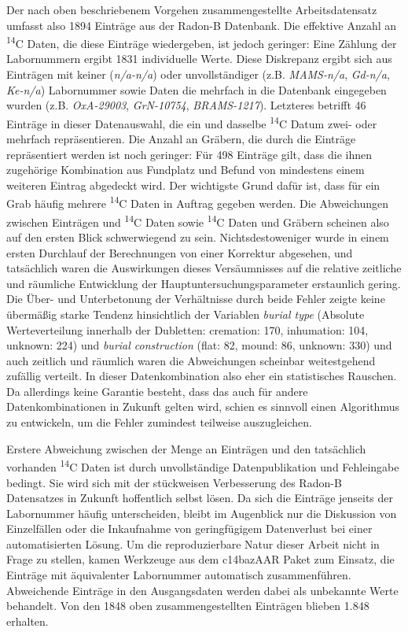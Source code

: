 \documentclass[openany,twoside,twocolumn]{book}
\begin{document}
Der nach oben beschriebenem Vorgehen zusammengestellte Arbeitsdatensatz
umfasst also 1894 Einträge aus der Radon-B Datenbank. Die effektive
Anzahl an \textsuperscript{14}C Daten, die diese Einträge wiedergeben,
ist jedoch geringer: Eine Zählung der Labornummern ergibt 1831
individuelle Werte. Diese Diskrepanz ergibt sich aus Einträgen mit
keiner (\emph{n/a-n/a}) oder unvollständiger (z.B. \emph{MAMS-n/a},
\emph{Gd-n/a}, \emph{Ke-n/a}) Labornummer sowie Daten die mehrfach in
die Datenbank eingegeben wurden (z.B. \emph{OxA-29003},
\emph{GrN-10754}, \emph{BRAMS-1217}). Letzteres betrifft 46 Einträge in
dieser Datenauswahl, die ein und dasselbe \textsuperscript{14}C Datum
zwei- oder mehrfach repräsentieren. Die Anzahl an Gräbern, die durch die
Einträge repräsentiert werden ist noch geringer: Für 498 Einträge gilt,
dass die ihnen zugehörige Kombination aus Fundplatz und Befund von
mindestens einem weiteren Eintrag abgedeckt wird. Der wichtigste Grund
dafür ist, dass für ein Grab häufig mehrere \textsuperscript{14}C Daten
in Auftrag gegeben werden. Die Abweichungen zwischen Einträgen und
\textsuperscript{14}C Daten sowie \textsuperscript{14}C Daten und
Gräbern scheinen also auf den ersten Blick schwerwiegend zu sein.
Nichtsdestoweniger wurde in einem ersten Durchlauf der Berechnungen von
einer Korrektur abgesehen, und tatsächlich waren die Auswirkungen dieses
Versäumnisses auf die relative zeitliche und räumliche Entwicklung der
Hauptuntersuchungsparameter erstaunlich gering. Die Über- und
Unterbetonung der Verhältnisse durch beide Fehler zeigte keine übermäßig
starke Tendenz hinsichtlich der Variablen \emph{burial type} (Absolute
Werteverteilung innerhalb der Dubletten: cremation: 170, inhumation:
104, unknown: 224) und \emph{burial construction} (flat: 82, mound: 86,
unknown: 330) und auch zeitlich und räumlich waren die Abweichungen
scheinbar weitestgehend zufällig verteilt. In dieser Datenkombination
also eher ein statistisches Rauschen. Da allerdings keine Garantie
besteht, dass das auch für andere Datenkombinationen in Zukunft gelten
wird, schien es sinnvoll einen Algorithmus zu entwickeln, um die Fehler
zumindest teilweise auszugleichen.

Erstere Abweichung zwischen der Menge an Einträgen und den tatsächlich
vorhanden \textsuperscript{14}C Daten ist durch unvollständige
Datenpublikation und Fehleingabe bedingt. Sie wird sich mit der
stückweisen Verbesserung des Radon-B Datensatzes in Zukunft hoffentlich
selbst lösen. Da sich die Einträge jenseits der Labornummer häufig
unterscheiden, bleibt im Augenblick nur die Diskussion von Einzelfällen
oder die Inkaufnahme von geringfügigem Datenverlust bei einer
automatisierten Lösung. Um die reproduzierbare Natur dieser Arbeit nicht
in Frage zu stellen, kamen Werkzeuge aus dem c14bazAAR Paket zum
Einsatz, die Einträge mit äquivalenter Labornummer automatisch
zusammenführen. Abweichende Einträge in den Ausgangsdaten werden dabei
als unbekannte Werte behandelt. Von den 1848 oben zusammengestellten
Einträgen blieben 1.848 erhalten.
\end{document}
